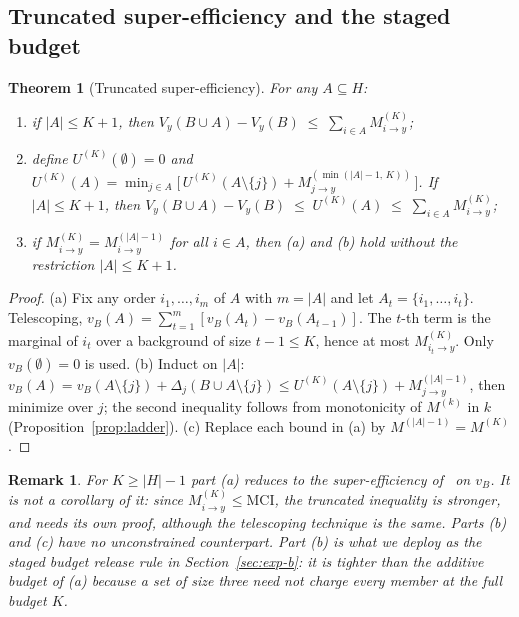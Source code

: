 \documentclass[preprint,12pt]{elsarticle}
\newtheorem{theorem}{Theorem}
\newtheorem{remark}{Remark}
\newcommand{\Vy}{V_{y}}
\newcommand{\Mik}{M^{(K)}_{i \to y}}
\begin{document}
\subsection{Truncated super-efficiency and the staged budget}
\begin{theorem}[Truncated super-efficiency]\label{thm:super}
For any $A \subseteq H$:
\begin{enumerate}
\item[(a)] if $|A| \le K+1$, then
$\Vy(B \cup A) - \Vy(B) \;\le\; \sum_{i \in A} \Mik$;
\item[(b)] define $U^{(K)}(\emptyset)=0$ and
$U^{(K)}(A) = \min_{j \in A}\big[\,U^{(K)}(A\setminus\{j\}) +
M^{(\min(|A|-1,\,K))}_{j \to y}\,\big]$.
If $|A| \le K+1$, then
$\Vy(B\cup A)-\Vy(B) \;\le\; U^{(K)}(A) \;\le\; \sum_{i\in A}\Mik$;
\item[(c)] if $M^{(K)}_{i\to y} = M^{(|A|-1)}_{i \to y}$ for all $i \in A$, then (a) and (b)
hold without the restriction $|A| \le K+1$.
\end{enumerate}
\end{theorem}
\begin{proof}
(a) Fix any order $i_1,\dots,i_m$ of $A$ with $m=|A|$ and let $A_t=\{i_1,\dots,i_t\}$.
Telescoping, $v_B(A)=\sum_{t=1}^{m}[v_B(A_t)-v_B(A_{t-1})]$. The $t$-th term is the
marginal of $i_t$ over a background of size $t-1 \le K$, hence at most
$M^{(K)}_{i_t \to y}$. Only $v_B(\emptyset)=0$ is used.
(b) Induct on $|A|$: $v_B(A)=v_B(A\setminus\{j\})+\Delta_j(B\cup A\setminus\{j\})
\le U^{(K)}(A\setminus\{j\}) + M^{(|A|-1)}_{j\to y}$, then minimize over $j$; the second
inequality follows from monotonicity of $M^{(k)}$ in $k$ (Proposition~\ref{prop:ladder}).
(c) Replace each bound in (a) by $M^{(|A|-1)} = M^{(K)}$.
\end{proof}

\begin{remark}
For $K \ge |H|-1$ part (a) reduces to the super-efficiency of~\cite{catav2021mci} on $v_B$.
It is not a corollary of it: since $\Mik \le \mathrm{MCI}$, the truncated inequality is
\emph{stronger}, and needs its own proof, although the telescoping technique is the same.
Parts (b) and (c) have no unconstrained counterpart. Part (b) is what we deploy as the
\emph{staged budget} release rule in Section~\ref{sec:exp-b}: it is tighter than the
additive budget of (a) because a set of size three need not charge every member at the
full budget $K$.
\end{remark}
\end{document}

